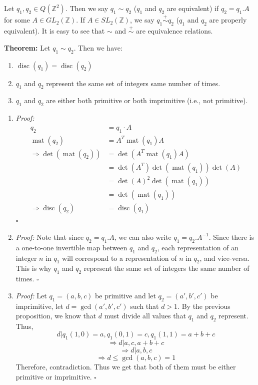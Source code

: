 \documentclass[a4paper,11pt,abstracton]{scrartcl}
\theoremstyle{dotlessP}
\theoremstyle{dotlessS}
\theoremstyle{remark}
\theoremstyle{definition}
\begin{document}
\begin{definition_box}
Let $q_1,q_2 \in Q(\mathbb{Z}^2)$. Then we say $q_1 \sim q_2$ ($q_1$ and $q_2$ are equivalent) if $q_2=q_1.A$ for some $A \in GL_2(\mathbb{Z})$. If $A \in SL_2(\mathbb{Z})$, we say $q_1 \overset{+}{\sim} q_2$ ($q_1$ and $q_2$ are properly equivalent). It is easy to see that $\sim$ and $\overset{+}{\sim}$ are equivalence relations.
\end{definition_box}

\begin{problem_box}
\textbf{Theorem:}
Let $q_1 \sim q_2$. Then we have:
\begin{enumerate}
\item $\operatorname{disc}(q_1)=\operatorname{disc}(q_2)$
\item $q_1$ and $q_2$ represent the same set of integers same number of times.
\item $q_1$ and $q_2$ are either both primitive or both imprimitive (i.e., not primitive).
\end{enumerate}
\end{problem_box}

\begin{claim_box}

\begin{enumerate}
\item 
\textit{Proof:}
\begin{align*}
q_2 &= q_1 \cdot A \\
\operatorname{\operatorname{mat}}(q_2) &= A^{T}\operatorname{\operatorname{mat}}(q_1)A \\
\Rightarrow \det(\operatorname{\operatorname{mat}}(q_2)) &= \det(A^{T}\operatorname{\operatorname{mat}}(q_1)A) \\
&= \det(A^{T})\det(\operatorname{\operatorname{mat}}(q_1))\det(A) \\
&= \det(A)^2\det(\operatorname{\operatorname{mat}}(q_1)) \\
&= \det(\operatorname{\operatorname{mat}}(q_1)) \\
\Rightarrow \operatorname{disc}(q_2) &= \operatorname{disc}(q_1)
\end{align*}
\hfill$\square$
\item 
\textit{Proof:}
Note that since $q_2=q_1.A$, we can also write $q_1=q_2.A^{-1}$. Since there is a one-to-one invertible map between $q_1$ and $q_2$, each representation of an integer $n$ in $q_1$ will correspond to a representation of $n$ in $q_2$, and vice-versa. This is why $q_1$ and $q_2$ represent the same set of integers the same number of times.
\hfill$\square$
\item 
\textit{Proof:}
Let $q_1=(a,b,c)$ be primitive and let $q_2=(a',b',c')$ be imprimitive, let $d=\gcd(a',b',c')$ such that $d > 1$. By the previous proposition, we know that $d$ must divide all values that $q_1$ and $q_2$ represent. Thus,
$$d|q_1(1,0)=a, q_1(0,1)=c, q_1(1,1)=a+b+c$$
$$\Rightarrow d|a,c,a+b+c$$
$$\Rightarrow d|a,b,c$$
$$\Rightarrow d \le \gcd(a,b,c)=1$$
Therefore, contradiction. Thus we get that both of them must be either primitive or imprimitive.
\hfill$\square$
\end{enumerate}
\end{claim_box}
\end{document}

